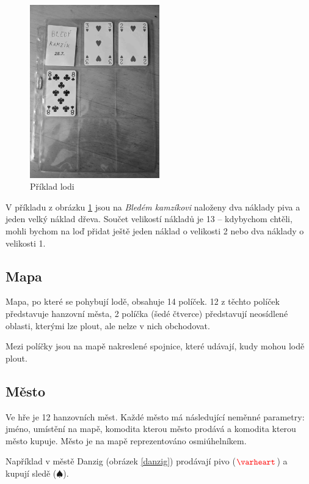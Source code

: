 \documentclass[a4paper, 12pt, twoside]{article}
\newcommand{\cheart}[1]{$#1\color{red}\varheart$}
\newcommand{\cspade}[1]{$#1\spadesuit$}
\begin{document}
\begin{figure}
\centering
\includegraphics[width=0.5\textwidth]{figs/kamzikG.jpg}
\caption{Příklad lodi}
\label{prlod}
\vspace{-50pt}
\end{figure}

V příkladu z obrázku \ref{prlod} jsou na \emph{Bledém kamzíkovi} naloženy dva náklady piva a jeden velký náklad dřeva.  Součet velikostí nákladů je 13 -- 
kdybychom chtěli, mohli bychom na loď přidat ještě jeden náklad o velikosti 2 nebo dva náklady o velikosti 1.

\subsection{Mapa}

Mapa, po které se pohybují lodě, obsahuje 14 políček.  12 z těchto políček představuje hanzovní města, 2 políčka
(šedé čtverce) představují neosídlené oblasti, kterými lze plout, ale nelze v nich obchodovat.

Mezi políčky jsou na mapě nakreslené spojnice, které udávají, kudy mohou lodě plout.

\subsection{Město}

Ve hře je 12 hanzovních měst.  Každé město má následující neměnné parametry:  jméno, umístění na mapě, komodita kterou město prodává a komodita
kterou město kupuje.  Město je na mapě reprezentováno osmiúhelníkem.

Například v městě Danzig (obrázek \ref{danzig}) prodávají pivo (\cheart{}) a kupují sledě (\cspade{}).
\end{document}
